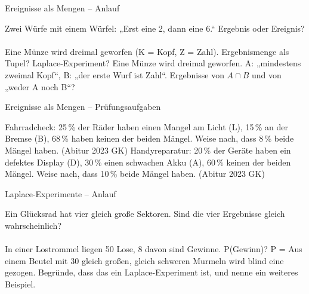 \setcounter{aufgabe}{0}

\begin{aufgabe}{Ereignisse als Mengen – Anlauf}
\begin{teile}
\teil Zwei Würfe mit einem Würfel: „Erst eine 2, dann eine 6.“ Ergebnis oder Ereignis?\\ \\ 
\teil Eine Münze wird dreimal geworfen (K = Kopf, Z = Zahl). Ergebnismenge als Tupel? Laplace-Experiment?
\teil Eine Münze wird dreimal geworfen. A: „mindestens zweimal Kopf“, B: „der erste Wurf ist Zahl“. Ergebnisse von $A \cap B$ und von „weder A noch B“?
\end{teile}
\end{aufgabe}

\begin{aufgabe}{Ereignisse als Mengen – Prüfungsaufgaben}
\begin{teile}
\teil Fahrradcheck: 25\,\% der Räder haben einen Mangel am Licht (L), 15\,\% an der Bremse (B), 68\,\% haben keinen der beiden Mängel. Weise nach, dass 8\,\% beide Mängel haben. \hfill (Abitur 2023 GK)
\teil Handyreparatur: 20\,\% der Geräte haben ein defektes Display (D), 30\,\% einen schwachen Akku (A), 60\,\% keinen der beiden Mängel. Weise nach, dass 10\,\% beide Mängel haben. \hfill (Abitur 2023 GK)
\end{teile}
\end{aufgabe}

\begin{aufgabe}{Laplace-Experimente – Anlauf}
\begin{teile}
\teil Ein Glücksrad hat vier gleich große Sektoren. Sind die vier Ergebnisse gleich wahrscheinlich?\\ \\ 
\teil In einer Lostrommel liegen 50 Lose, 8 davon sind Gewinne. P(Gewinn)? P = \leerfeld
\teil Aus einem Beutel mit 30 gleich großen, gleich schweren Murmeln wird blind eine gezogen. Begründe, dass das ein Laplace-Experiment ist, und nenne ein weiteres Beispiel.
\end{teile}
\end{aufgabe}


